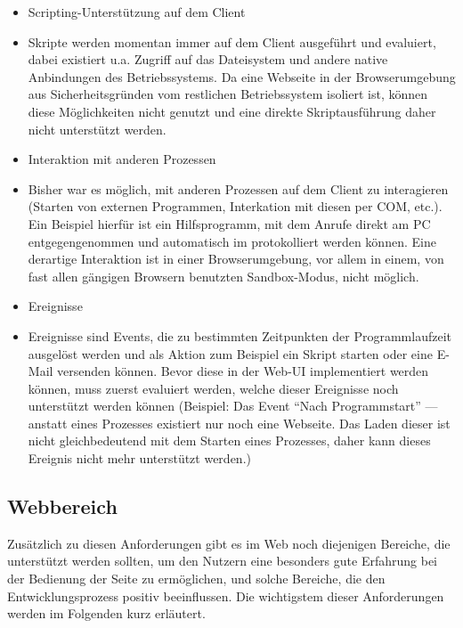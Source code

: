 \begin{itemize}
    \item{Scripting-Unterstützung auf dem Client}
    \item[] Skripte werden momentan immer auf dem Client ausgeführt und evaluiert, dabei existiert u.a. Zugriff auf das Dateisystem und andere native Anbindungen des Betriebssystems. Da eine Webseite in der Browserumgebung aus Sicherheitsgründen vom restlichen Betriebssystem isoliert ist, können diese Möglichkeiten nicht genutzt und eine direkte Skriptausführung daher nicht unterstützt werden. 
    \item{Interaktion mit anderen Prozessen}
    \item[] Bisher war es möglich, mit anderen Prozessen auf dem Client zu interagieren (Starten von externen Programmen, Interkation mit diesen per \gls{COM}, etc.). Ein Beispiel hierfür ist ein Hilfsprogramm, mit dem Anrufe direkt am PC entgegengenommen und automatisch im  protokolliert werden können. Eine derartige Interaktion ist in einer Browserumgebung, vor allem in einem, von fast allen gängigen Browsern benutzten Sandbox-Modus, nicht möglich.
    \item{Ereignisse} 
    \item[] Ereignisse sind Events, die zu bestimmten Zeitpunkten der Programmlaufzeit ausgelöst werden und als Aktion zum Beispiel ein Skript starten oder eine E-Mail versenden können. Bevor diese in der Web-UI implementiert werden können, muss zuerst evaluiert werden, welche dieser Ereignisse noch unterstützt werden können (Beispiel: Das Event ``Nach Programmstart'' --- anstatt eines Prozesses existiert nur noch eine Webseite. Das Laden dieser ist nicht gleichbedeutend mit dem Starten eines Prozesses, daher kann dieses Ereignis nicht mehr unterstützt werden.)
\end{itemize}

\subsection{Webbereich}
Zusätzlich zu diesen Anforderungen gibt es im Web noch diejenigen Bereiche, die unterstützt werden sollten, um den Nutzern eine besonders gute Erfahrung bei der Bedienung der Seite zu ermöglichen, und solche Bereiche, die den Entwicklungsprozess positiv beeinflussen. Die wichtigstem dieser Anforderungen werden im Folgenden kurz erläutert. 

